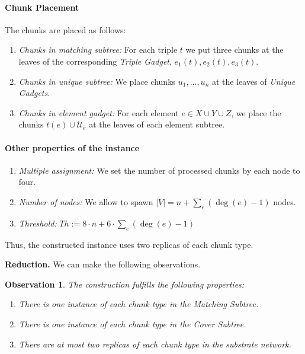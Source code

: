 \documentclass[preprint,12pt]{elsarticle}
\newcommand{\numNodes}{\ensuremath{|V|}}
\newcommand{\MatchSubtree}{{\emph{Matching Subtree}}}
\newcommand{\CoverSubtree}{{\emph{Cover Subtree}}}
\newcommand{\TripleGadget}{{\emph{Triple Gadget}}}
\newcommand{\UnqGadgets}{{\emph{Unique Gadgets}}}
\newcommand{\UniqueE}{{\ensuremath{\mathcal{U}_e}}}
\newtheorem{obs}{Observation}
\newcommand{\Thr}{\ensuremath{Th}}
\begin{document}
\paragraph{Chunk Placement}
The chunks are placed as follows:
\begin{enumerate}
  \item \emph{Chunks in matching subtree:} For each triple $t$ we put
  three chunks at the leaves of the corresponding \TripleGadget,
  $e_1(t), e_2(t), e_3(t)$.
  \item \emph{Chunks in unique subtree:} We place chunks
  $u_1,\ldots, u_n$ at the leaves of \UnqGadgets.
  \item \emph{Chunks in element gadget:} For each element
  $e\in X\cup Y\cup Z$, we place the chunks $t(e)\cup \UniqueE$ at the
  leaves of each element subtree.
\end{enumerate}

\paragraph{Other properties of the instance}
\begin{enumerate}
  \item \emph{Multiple assignment:} We set the number of processed
  chunks by each node to four.
  \item \emph{Number of nodes:} We allow to spawn
  $\numNodes = n + \sum_{e}(\deg(e)-1)$ nodes.
  \item \emph{Threshold:}
  $\Thr := 8\cdot n + 6\cdot\sum_{e}(\deg(e)-1)$
\end{enumerate}

Thus, the constructed instance uses two replicas of each chunk type.

\textbf{Reduction.}  We can make the following observations.

\begin{obs}
  The construction fulfills the following properties:
  \begin{enumerate}
    \item There is one instance of each chunk type in the
    \MatchSubtree.

    \item There is one instance of each chunk type in the
    \CoverSubtree.

    \item There are at most two replicas of each chunk type in the
    substrate network.
  \end{enumerate}
\end{obs}
\end{document}
